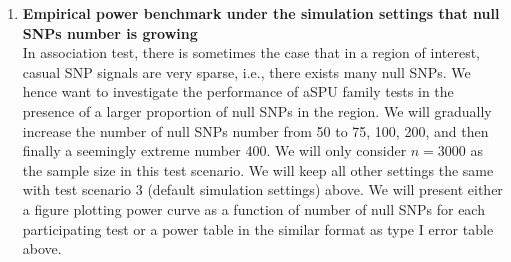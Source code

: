 \documentclass[12pt]{article}
\begin{document}
\begin{enumerate}
\item \textbf{Empirical power benchmark under the simulation settings that null SNPs number is growing}\\
In association test, there is sometimes the case that in a region of interest, casual SNP signals are very sparse, i.e., there exists many null SNPs. We hence want to investigate the performance of aSPU family tests in the presence of a larger proportion of null SNPs in the region. We will gradually increase the number of null SNPs number from 50 to 75, 100, 200, and then finally a seemingly extreme number 400. We will only consider $n = 3000$ as the sample size in this test scenario. We will keep all other settings the same with test scenario 3 (default simulation settings) above. We will present either a figure plotting power curve as a function of number of null SNPs for each participating test or a power table in the similar format as type I error table above.


\end{enumerate}
\end{document}
